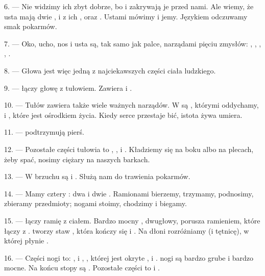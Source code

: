 6. --- Nie widzimy ich zbyt dobrze, bo  i  zakrywają je
przed nami. Ale wiemy, że usta mają dwie ,  i
 z ich , oraz . Ustami mówimy i jemy.
Językiem odczuwamy smak pokarmów.

7. --- Oko, ucho, nos i usta są, tak samo jak palce, narządami pięciu zmysłów:
, , , , .

8. --- Głowa jest więc jedną z najciekawszych części ciała ludzkiego.

\VUsaut{4.4mm}
\VUsaut{3.0mm}

9. ---  łączy głowę z tułowiem. Zawiera  i .

10. --- Tułów zawiera także wiele ważnych narządów. W  są
, którymi oddychamy, i , które jest ośrodkiem życia. Kiedy
serce przestaje bić, istota żywa umiera.

11. ---  podtrzymują pierś.

12. --- Pozostałe części tułowia to , ,  i
. Kładziemy się na boku albo na plecach, żeby spać, nosimy ciężary na
naszych barkach.

13. --- W brzuchu są  i . Służą nam do trawienia
pokarmów.

\VUsaut{4.4mm}
\VUsaut{3.0mm}

14. --- Mamy cztery : dwa  i dwie .
Ramionami bierzemy, trzymamy, podnosimy, zbieramy przedmioty; nogami stoimy, chodzimy i
biegamy.

15. ---  łączy ramię z ciałem. Bardzo mocny , dwugłowy,
porusza ramieniem, które  łączy z .
 tworzy staw , która kończy się  i
. Na dłoni rozróżniamy  (i tętnicę), w której płynie
.

16. --- Części nogi to: ,  i ,
, której  jest okryte ,  i
.  nogi są bardzo grube i bardzo mocne. Na końcu stopy są
. Pozostałe części to  i .

